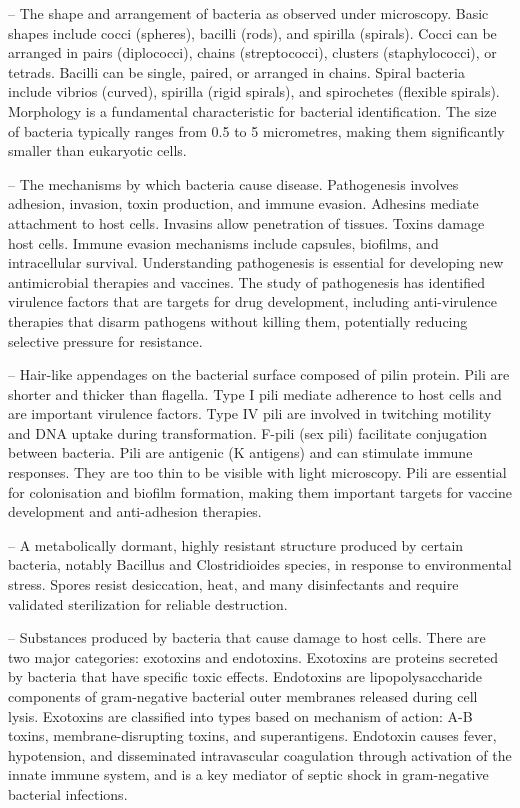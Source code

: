 -- The shape and arrangement of bacteria as observed under microscopy. Basic shapes include cocci (spheres), bacilli (rods), and spirilla (spirals). Cocci can be arranged in pairs (diplococci), chains (streptococci), clusters (staphylococci), or tetrads. Bacilli can be single, paired, or arranged in chains. Spiral bacteria include vibrios (curved), spirilla (rigid spirals), and spirochetes (flexible spirals). Morphology is a fundamental characteristic for bacterial identification. The size of bacteria typically ranges from 0.5 to 5 micrometres, making them significantly smaller than eukaryotic cells.

-- The mechanisms by which bacteria cause disease. Pathogenesis involves adhesion, invasion, toxin production, and immune evasion. Adhesins mediate attachment to host cells. Invasins allow penetration of tissues. Toxins damage host cells. Immune evasion mechanisms include capsules, biofilms, and intracellular survival. Understanding pathogenesis is essential for developing new antimicrobial therapies and vaccines. The study of pathogenesis has identified virulence factors that are targets for drug development, including anti-virulence therapies that disarm pathogens without killing them, potentially reducing selective pressure for resistance.

-- Hair-like appendages on the bacterial surface composed of pilin protein. Pili are shorter and thicker than flagella. Type I pili mediate adherence to host cells and are important virulence factors. Type IV pili are involved in twitching motility and DNA uptake during transformation. F-pili (sex pili) facilitate conjugation between bacteria. Pili are antigenic (K antigens) and can stimulate immune responses. They are too thin to be visible with light microscopy. Pili are essential for colonisation and biofilm formation, making them important targets for vaccine development and anti-adhesion therapies.

-- A metabolically dormant, highly resistant structure produced by certain bacteria, notably Bacillus and Clostridioides species, in response to environmental stress. Spores resist desiccation, heat, and many disinfectants and require validated sterilization for reliable destruction.

-- Substances produced by bacteria that cause damage to host cells. There are two major categories: exotoxins and endotoxins. Exotoxins are proteins secreted by bacteria that have specific toxic effects. Endotoxins are lipopolysaccharide components of gram-negative bacterial outer membranes released during cell lysis. Exotoxins are classified into types based on mechanism of action: A-B toxins, membrane-disrupting toxins, and superantigens. Endotoxin causes fever, hypotension, and disseminated intravascular coagulation through activation of the innate immune system, and is a key mediator of septic shock in gram-negative bacterial infections.

